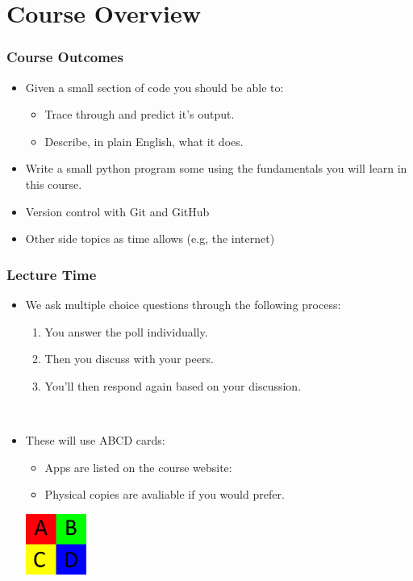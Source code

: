 \documentclass{beamer}
\begin{document}
\section{Course Overview}

\begin{frame}
  \frametitle{Course Outcomes}
  \begin{itemize}
    \item Given a small section of code you should be able to:
      \begin{itemize}
        \item Trace through and predict it's output.
        \item Describe, in plain English, what it does.
      \end{itemize}
    \item Write a small python program some using the fundamentals you will learn in this course.
    \item Version control with Git and GitHub
    \item Other side topics as time allows (e.g, the internet)
  \end{itemize}
\end{frame}

\begin{frame}
  \frametitle{Lecture Time}
  \begin{itemize}
    \item We ask multiple choice questions through the following process:
      \begin{enumerate}
        \item You answer the poll individually.
        \item Then you discuss with your peers.
        \item You'll then respond again based on your discussion. 
      \end{enumerate}
      \\ \vfill 
    \item These will use ABCD cards:\\
      \begin{minipage}{0.45\textwidth}
        \begin{itemize}
          \item Apps are listed on the course website: 
          \item Physical copies are avaliable if you would prefer.
        \end{itemize}
      \end{minipage}
      \begin{minipage}{0.45\textwidth} 
        \includegraphics[height=75px]{./imgs/abcd.png}
      \end{minipage}
  \end{itemize}
\end{frame}
\end{document}
